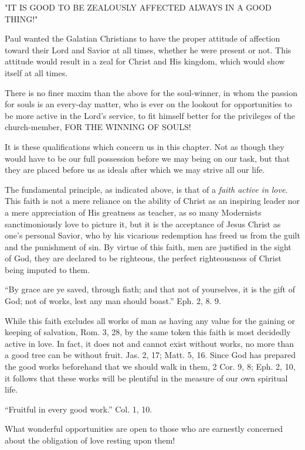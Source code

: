 \documentclass[
]{book}
\begin{document}
\begin{center} "IT IS GOOD TO BE ZEALOUSLY AFFECTED ALWAYS IN A GOOD THING!" \end{center}

Paul wanted the Galatian Christians to have the proper attitude of affection toward their Lord and Savior at all times, whether he were present or not. This attitude would result in a zeal for Christ and His kingdom, which would show itself at all times.

There is no finer maxim than the above for the soul-winner, in whom the passion for souls is an every-day matter, who is ever on the lookout for opportunities to be more active in the Lord's service, to fit himself better for the privileges of the church-member, FOR THE WINNING OF SOULS!

It is these qualifications which concern us in this chapter. Not as though they would have to be our full possession before we may being on our task, but that they are placed before us as ideals after which we may strive all our life.

The fundamental principle, as indicated above, is that of a \emph{faith active in love}. This faith is not a mere reliance on the ability of Christ as an inspiring leader nor a mere appreciation of His greatness as teacher, as so many Modernists sanctimoniously love to picture it, but it is the acceptance of Jesus Christ as one's personal Savior, who by his vicarious redemption has freed us from the guilt and the punishment of sin. By virtue of this faith, men are justified in the sight of God, they are declared to be righteous, the perfect righteousness of Christ being imputed to them.

``By grace are ye saved, through fiath; and that not of yourselves, it is the gift of God; not of works, lest any man should boast.'' Eph. 2, 8. 9.

While this faith excludes all works of man as having any value for the gaining or keeping of salvation, Rom. 3, 28, by the same token this faith is most decidedly active in love. In fact, it does not and cannot exist without works, no more than a good tree can be without fruit. Jas. 2, 17; Matt. 5, 16. Since God has prepared the good works beforehand that we should walk in them, 2 Cor. 9, 8; Eph. 2, 10, it follows that these works will be plentiful in the measure of our own spiritual life.

``Fruitful in every good work.'' Col. 1, 10.

What wonderful opportunities are open to those who are earnestly concerned about the obligation of love resting upon them!
\end{document}

